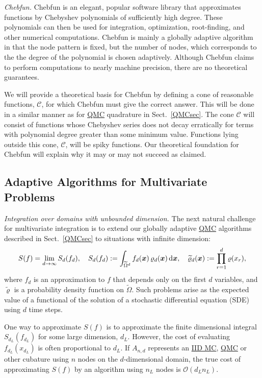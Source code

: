 \documentclass[11pt]{NSFamsart}
\newcommand{\QMC}{\hyperlink{QMClink}{QMC}\xspace}
\newcommand{\IIDMC}{\hyperlink{IIDMClink}{IID MC}\xspace}
\newcommand{\tOmega}{\widetilde{\Omega}}
\newcommand{\tvarrho}{\widetilde{\varrho}}
\newcommand{\bx}{{\boldsymbol{x}}}
\def\dif{\textup{d}}
\newcommand{\cc}{\mathcal{C}}
\newcommand{\Order}{\mathcal{O}}
\begin{document}
\emph{Chebfun.}
Chebfun \cite{TrefEtal17a} is an elegant, popular software library that approximates functions by 
Chebyshev polynomials of 
sufficiently high degree.  These polynomials can then be used for integration, optimization, 
root-finding, and other numerical computations.  Chebfun is mainly a globally adaptive algorithm in 
that the node pattern is fixed, but the number of nodes, which corresponds to 
the the degree of the polynomial is chosen adaptively.  Although Chebfun claims to perform 
computations 
to nearly machine precision, there are no theoretical guarantees.  

We will provide a theoretical basis for Chebfun by defining a cone of reasonable functions, 
$\cc$, for which Chebfun must give the correct answer.  This will be done in a similar manner as for 
\QMC quadrature in Sect.\ \ref{QMCsec}.  The cone $\cc$ will consist of functions 
whose Chebyshev series does not decay erratically for terms with polynomial degree greater than 
some minimum value.  Functions lying outside this cone, $\cc$, will be spiky functions.   Our 
theoretical foundation for Chebfun will explain why it may or may not succeed as claimed.

\subsection{Adaptive Algorithms for Multivariate Problems}\label{SectMultiProb}

\emph{Integration over domains with unbounded dimension.} The next natural challenge for 
multivariate integration is to extend our 
globally adaptive \QMC algorithms described in Sect.\ \ref{QMCsec} to situations with infinite 
dimension:
\[
S(f) = \lim_{d \to \infty} S_d(f_d), \quad S_d(f_d):= \int_{\tOmega^d} f_d(\bx) \, \varrho_d(\bx) \, \dif 
\bx, \quad \tvarrho_d(\bx) : = \prod_{r=1}^{d} \varrho(x_r),
\]
where $f_d$ is an  approximation to $f$ that depends only on the first $d$ variables, and $\tvarrho$ 
is a probability density function on $\tOmega$.  Such 
problems arise as the expected value of a functional of the solution of a 
stochastic differential equation (SDE) using $d$ time steps.  

One way to approximate $S(f)$ is to approximate the finite 
dimensional integral $S_{d_L}(f_{d_L})$ for some large dimension, $d_L$.  However, the cost of 
evaluating $f_{d_L}(x_{d_L})$ is often proportional to $d_L$.  If $A_{n,d}$ represents an \IIDMC, 
\QMC or other cubature 
using $n$ nodes on the $d$-dimensional domain,  the true cost of approximating $S(f)$ by an 
algorithm using 
$n_L$ nodes is
$\Order(d_L n_L)$.
\end{document}
